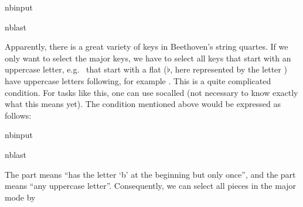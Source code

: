 \documentclass[letterpaper,10pt,english]{sphinxmanual}
\begin{document}
\begin{sphinxuseclass}{nbinput}
\begin{sphinxuseclass}{nblast}
{
\begin{sphinxVerbatim}[commandchars=\\\{\}]
\llap{\color{nbsphinxin}[ ]:\,\hspace{\fboxrule}\hspace{\fboxsep}}
\end{sphinxVerbatim}
}

\end{sphinxuseclass}
\end{sphinxuseclass}
\sphinxAtStartPar
Apparently, there is a great variety of keys in Beethoven’s string quartes. If we only want to select the major keys, we have to select all keys that start with an uppercase letter, e.g.   that start with a flat (\(\flat\), here represented by the letter )  have uppercase letters following, for example . This is a quite complicated condition. For tasks like this, one can use so\sphinxhyphen{}called  (not necessary to know exactly what this means
yet). The condition mentioned above would be expressed as follows:

\begin{sphinxuseclass}{nbinput}
\begin{sphinxuseclass}{nblast}
{
\begin{sphinxVerbatim}[commandchars=\\\{\}]
\llap{\color{nbsphinxin}[ ]:\,\hspace{\fboxrule}\hspace{\fboxsep}}  
\end{sphinxVerbatim}
}

\end{sphinxuseclass}
\end{sphinxuseclass}
\sphinxAtStartPar
The  part means “has the letter ‘b’ at the beginning but only once”, and the \sphinxcode{\sphinxupquote{{[}A\sphinxhyphen{}Z{]}}} part means “any uppercase letter”. Consequently, we can select all pieces in the major mode by
\end{document}

